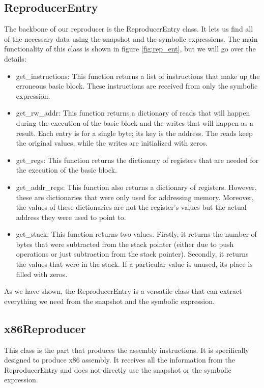 \subsection{ReproducerEntry}
The backbone of our reproducer is the ReproducerEntry class.
It lets us find all of the necessary data using the snapshot and the symbolic expressions.
The main functionality of this class is shown in figure \ref{fig:rep_ent}, but we will go over the details:

\begin{itemize}
    \item get\_instructions:
    This function returns a list of instructions that make up the erroneous basic block.
    These instructions are received from only the symbolic expression.
    \item get\_rw\_addr:
    This function returns a dictionary of reads that will happen during the execution of the basic block and the writes that will happen as a result.
    Each entry is for a single byte; its key is the address.
    The reads keep the original values, while the writes are initialized with zeros.
    \item get\_regs:
    This function returns the dictionary of registers that are needed for the execution of the basic block.
    \item get\_addr\_regs:
    This function also returns a dictionary of registers.
    However, these are dictionaries that were only used for addressing memory.
    Moreover, the values of these dictionaries are not the register's values but the actual address they were used to point to.
    \item get\_stack:
    This function returns two values.
    Firstly, it returns the number of bytes that were subtracted from the stack pointer (either due to push operations or just subtraction from the stack pointer).
    Secondly, it returns the values that were in the stack.
    If a particular value is unused, its place is filled with zeros.
\end{itemize}

As we have shown, the ReproducerEntry is a versatile class that can extract everything we need from the snapshot and the symbolic expression.

\subsection{x86Reproducer}
This class is the part that produces the assembly instructions.
It is specifically designed to produce x86 assembly.
It receives all the information from the ReproducerEntry and does not directly use the snapshot or the symbolic expression.

